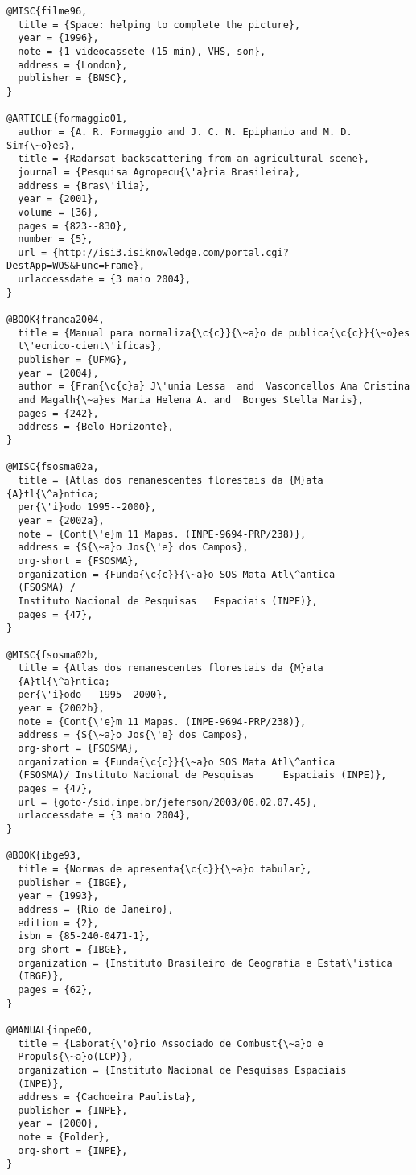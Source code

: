 \begin{verbatim}
@MISC{filme96,
  title = {Space: helping to complete the picture},
  year = {1996},
  note = {1 videocassete (15 min), VHS, son},
  address = {London},
  publisher = {BNSC},
}

@ARTICLE{formaggio01,
  author = {A. R. Formaggio and J. C. N. Epiphanio and M. D. Sim{\~o}es},
  title = {Radarsat backscattering from an agricultural scene},
  journal = {Pesquisa Agropecu{\'a}ria Brasileira},
  address = {Bras\'ilia},
  year = {2001},
  volume = {36},
  pages = {823--830},
  number = {5},
  url = {http://isi3.isiknowledge.com/portal.cgi?DestApp=WOS&Func=Frame},
  urlaccessdate = {3 maio 2004},
}
 
@BOOK{franca2004,
  title = {Manual para normaliza{\c{c}}{\~a}o de publica{\c{c}}{\~o}es 
  t\'ecnico-cient\'ificas},
  publisher = {UFMG},
  year = {2004},
  author = {Fran{\c{c}a} J\'unia Lessa  and  Vasconcellos Ana Cristina 
  and Magalh{\~a}es Maria Helena A. and  Borges Stella Maris},
  pages = {242},
  address = {Belo Horizonte},
}

@MISC{fsosma02a,
  title = {Atlas dos remanescentes florestais da {M}ata {A}tl{\^a}ntica; 
  per{\'i}odo 1995--2000},
  year = {2002a},
  note = {Cont{\'e}m 11 Mapas. (INPE-9694-PRP/238)},
  address = {S{\~a}o Jos{\'e} dos Campos},
  org-short = {FSOSMA},
  organization = {Funda{\c{c}}{\~a}o SOS Mata Atl\^antica 
  (FSOSMA) / 
  Instituto Nacional de Pesquisas	Espaciais (INPE)},
  pages = {47},
}

@MISC{fsosma02b,
  title = {Atlas dos remanescentes florestais da {M}ata 
  {A}tl{\^a}ntica; 
  per{\'i}odo	1995--2000},
  year = {2002b},
  note = {Cont{\'e}m 11 Mapas. (INPE-9694-PRP/238)},
  address = {S{\~a}o Jos{\'e} dos Campos},
  org-short = {FSOSMA},
  organization = {Funda{\c{c}}{\~a}o SOS Mata Atl\^antica 
  (FSOSMA)/ Instituto Nacional de Pesquisas 	Espaciais (INPE)},
  pages = {47},
  url = {goto-/sid.inpe.br/jeferson/2003/06.02.07.45},
  urlaccessdate = {3 maio 2004},
}

@BOOK{ibge93,
  title = {Normas de apresenta{\c{c}}{\~a}o tabular},
  publisher = {IBGE},
  year = {1993},
  address = {Rio de Janeiro},
  edition = {2},
  isbn = {85-240-0471-1},
  org-short = {IBGE},
  organization = {Instituto Brasileiro de Geografia e Estat\'istica
  (IBGE)},
  pages = {62},
}  

@MANUAL{inpe00,
  title = {Laborat{\'o}rio Associado de Combust{\~a}o e 
  Propuls{\~a}o(LCP)},
  organization = {Instituto Nacional de Pesquisas Espaciais 
  (INPE)},
  address = {Cachoeira Paulista},
  publisher = {INPE},
  year = {2000},
  note = {Folder},
  org-short = {INPE},
}


\end{verbatim}
